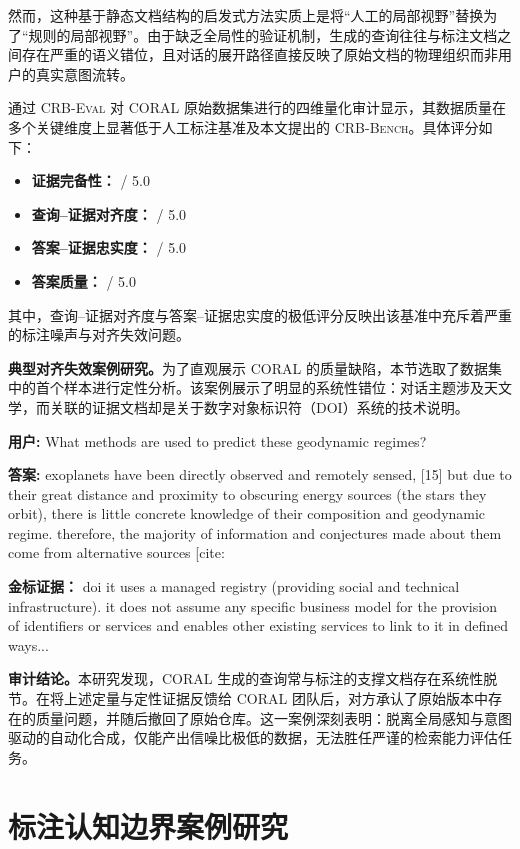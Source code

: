 然而，这种基于静态文档结构的启发式方法实质上是将“人工的局部视野”替换为了“规则的局部视野”。由于缺乏全局性的验证机制，生成的查询往往与标注文档之间存在严重的语义错位，且对话的展开路径直接反映了原始文档的物理组织而非用户的真实意图流转。

通过 \textsc{CRB-Eval} 对 CORAL 原始数据集进行的四维量化审计显示，其数据质量在多个关键维度上显著低于人工标注基准及本文提出的 \textsc{CRB-Bench}。具体评分如下：
\begin{itemize}
    \item \textbf{证据完备性：} \TBD{} / 5.0
    \item \textbf{查询--证据对齐度：} \TBD{} / 5.0
    \item \textbf{答案--证据忠实度：} \TBD{} / 5.0
    \item \textbf{答案质量：} \TBD{} / 5.0
\end{itemize}
其中，查询--证据对齐度与答案--证据忠实度的极低评分反映出该基准中充斥着严重的标注噪声与对齐失效问题。

\textbf{典型对齐失效案例研究。}为了直观展示 CORAL 的质量缺陷，本节选取了数据集中的首个样本进行定性分析。该案例展示了明显的系统性错位：对话主题涉及天文学，而关联的证据文档却是关于数字对象标识符（DOI）系统的技术说明。

\textbf{用户:} What methods are used to predict these geodynamic regimes?  

\textbf{答案:} exoplanets have been directly observed and remotely sensed, [15] but due to their great distance and proximity to obscuring energy sources (the stars they orbit), there is little concrete knowledge of their composition and geodynamic regime. therefore, the majority of information and conjectures made about them come from alternative sources [cite: 

\textbf{金标证据：} doi it uses a managed registry (providing social and technical infrastructure). it does not assume any specific business model for the provision of identifiers or services and enables other existing services to link to it in defined ways...

\textbf{审计结论。}本研究发现，CORAL 生成的查询常与标注的支撑文档存在系统性脱节。在将上述定量与定性证据反馈给 CORAL 团队后，对方承认了原始版本中存在的质量问题，并随后撤回了原始仓库。这一案例深刻表明：脱离全局感知与意图驱动的自动化合成，仅能产出信噪比极低的数据，无法胜任严谨的检索能力评估任务。
\section{标注认知边界案例研究}
\label{app:cognitive_boundary}

